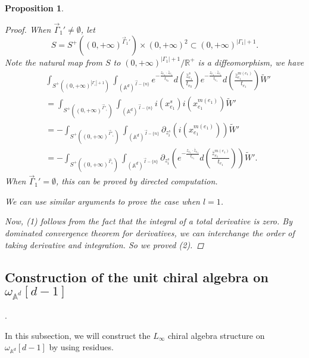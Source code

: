 \documentclass[11pt]{amsart}
\newtheorem{prop}[thm]{Proposition}
\theoremstyle{definition}
\theoremstyle{remark}
\numberwithin{equation}{section}
\begin{document}
\begin{prop}
\begin{proof}
        When $\vec{\Gamma}_{1}'\neq\emptyset$, let
        $$
        S=S^{+}((0,+\infty)^{\vec{\Gamma}_{1}'})\times(0,+\infty)^{2}\subset(0,+\infty)^{|\Gamma_{1}|+1}.
        $$
        Note the natural map from $S$ to $(0,+\infty)^{|\Gamma_{1}|+1}/\mathbb{R}^{+}$ is a diffeomorphism, we have
        \begin{align*}
            &\int_{S^{+}((0,+\infty)^{|\Gamma_{_{1}}|+1})}\int_{(\mathbb{A}^{d})^{\vec{I}-\{n\}}}
            e^{-\frac{z_{e_{1}}\cdot \bar{z}_{e_{1}}}{t_{e_{0}}}}d(\frac{\bar{z}_{e_{1}}^{s}}{t_{e_{0}}})e^{-\frac{z_{e_{1}}\cdot \bar{z}_{e_{1}}}{t_{e_{1}}}}d(\frac{\bar{z}_{e_{1}}^{m(e_{1})}}{t_{e_{1}}})\tilde{W}'\\
            &=
            \int_{S^{+}((0,+\infty)^{\vec{\Gamma}'_{_{1}}})}\int_{(\mathbb{A}^{d})^{\vec{I}-\{n\}}}i(x_{e_{1}}^{s})i(x_{e_{1}}^{m(e_{1})})\tilde{W}'\\
            &=
            -\int_{S^{+}((0,+\infty)^{\vec{\Gamma}'_{_{1}}})}\int_{(\mathbb{A}^{d})^{\vec{I}-\{n\}}}\partial_{z_{i}^{s}}(i(x_{e_{1}}^{m(e_{1})}))\tilde{W}'\\
            &=
            -\int_{S^{+}((0,+\infty)^{\vec{\Gamma}_{1}})}\int_{(\mathbb{A}^{d})^{\vec{I}-\{n\}}}\partial_{z_{i}^{s}}\left(e^{-\frac{z_{e_{1}}\cdot \bar{z}_{e_{1}}}{t_{e_{1}}}}d(\frac{\bar{z}_{e_{1}}^{m(e_{1})}}{t_{e_{1}}})\right)\tilde{W}'.
        \end{align*}
        When $\vec{\Gamma}_{1}'=\emptyset$, this can be proved by directed computation.

        We can use similar arguments to prove the case when $l=1$.

        Now, (1) follows from the fact that the integral of a total derivative is zero. By dominated convergence theorem for derivatives, we can interchange the order of taking derivative and integration. So we proved (2).
    \end{proof}
\end{prop}
\subsection{Construction of the unit chiral algebra on $\omega_{\mathbb{A}^{d}}[d-1]$}.

In this subsection, we will construct the $L_{\infty}$ chiral algebra structure on $\omega_{\mathbb{A}^{d}}[d-1]$ by using residues.
\end{document}
